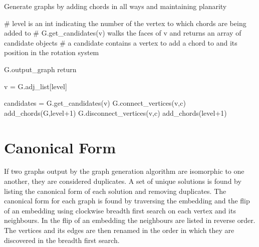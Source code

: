 \documentclass[12pt]{article}
\begin{document}
\begin{algorithm}
\caption{Generate graphs by adding chords in all ways and maintaining planarity}\label{euclid}
\begin{algorithmic}[1]
\scriptsize
{}
    \State \# level is an int indicating the number of the vertex to which chords are being added to
    \State \# G.get\_candidates(v) walks the faces of v and returns an array of candidate objects
    \State \# a candidate contains a vertex to add a chord to and its position in the rotation system

        \State G.output\_graph
        \State return
    \EndIf
    
    v = G.adj\_list[level]
    
        \State candidates = G.get\_candidates(v) 
            \State G.connect\_vertices(v,c)
            \State add\_chords(G,level+1)
            \State G.disconnect\_vertices(v,c)
        \EndFor
    \Else
        \State add\_chords(level+1)
    \EndIf
\EndProcedure

\end{algorithmic}
\end{algorithm}

\section{Canonical Form}

If two graphs output by the graph generation algorithm are isomorphic to one another, they are considered duplicates. A set of unique solutions is found by listing the canonical form of each solution and removing duplicates. The canonical form for each graph is found by traversing the embedding and the flip of an embedding using clockwise breadth first search on each vertex and its neighbours. In the flip of an embedding the neighbours are listed in reverse order. The vertices and its edges are then renamed in the order in which they are discovered in the breadth first search. 
\end{document}

